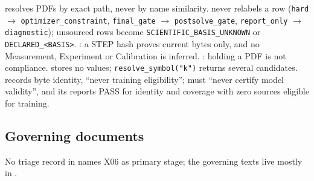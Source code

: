  resolves PDFs by exact path, never by name similarity.  never relabels a row (\texttt{hard} $\rightarrow$ \texttt{optimizer\_constraint}, \texttt{final\_gate} $\rightarrow$ \texttt{postsolve\_gate}, \texttt{report\_only} $\rightarrow$ \texttt{diagnostic}); unsourced rows become \texttt{SCIENTIFIC\_BASIS\_UNKNOWN} or \texttt{DECLARED\_<BASIS>}. : a STEP hash proves current bytes only, and no Measurement, Experiment or Calibration is inferred. : holding a PDF is not compliance.  stores no values; \texttt{resolve\_symbol("k")} returns several candidates.  records byte identity, ``never training eligibility'';  must ``never certify model validity'', and its  reports PASS for identity and coverage with zero sources eligible for training.

\subsection{Governing documents}
No triage record in  names X06 as primary stage; the governing texts live mostly in .

